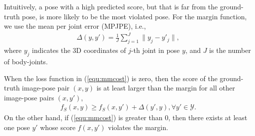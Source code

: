 \documentclass[10pt,twocolumn,letterpaper]{article}
\newcommand{\refeqn}[1]{(\ref{#1})}
\begin{document}
 Intuitively, a pose with a high predicted score, but that is far from the ground-truth pose, is more likely to be the most violated pose. 
For the margin function, we use the mean per joint error (MPJPE), i.e., 
\begin{align}
\Delta(y,y') = \frac{1}{J}\sum_{j=1}^{J} \| y_{j} - y'_{j}\|,
\end{align}
where $y_{j}$ indicates the 3D coordinates of $j$-th joint in pose $y$, and $J$ is the number of body-joints. 

When the loss function in \refeqn{equ:mmcost} is zero, then the score of the ground-truth image-pose pair $(x,y)$ is at least larger than the margin for all other image-pose pairs $(x,y')$, 
	\begin{align}
	f_{S}(x,y) \geq f_{S}(x,y') + \Delta(y', y), \forall y'\in{\mathcal Y}.
	\end{align}
On the other hand, if  \refeqn{equ:mmcost} is greater than 0, 
then there exists at least one pose $y'$ whose score $f(x,y')$ violates the margin. 
\end{document}
